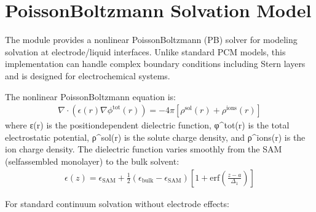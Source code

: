 \documentclass[letterpaper,10pt,english]{sphinxmanual}
\begin{document}
\section{Poisson\sphinxhyphen{}Boltzmann Solvation Model}
\label{\detokenize{examples:poisson-boltzmann-solvation-model}}
\sphinxAtStartPar
The  module provides a non\sphinxhyphen{}linear Poisson\sphinxhyphen{}Boltzmann (PB) solver for modeling solvation at electrode/liquid interfaces. Unlike standard PCM models, this implementation can handle complex boundary conditions including Stern layers and is designed for electrochemical systems.

\sphinxAtStartPar
The non\sphinxhyphen{}linear Poisson\sphinxhyphen{}Boltzmann equation is:
\begin{equation*}
\begin{split}\nabla \cdot (\epsilon(r)\nabla\phi^{\text{tot}}(r)) = -4\pi[\rho^{\text{sol}}(r) + \rho^{\text{ions}}(r)]\end{split}
\end{equation*}
\sphinxAtStartPar
where ε(r) is the position\sphinxhyphen{}dependent dielectric function, φ\textasciicircum{}tot(r) is the total electrostatic potential, ρ\textasciicircum{}sol(r) is the solute charge density, and ρ\textasciicircum{}ions(r) is the ion charge density. The dielectric function varies smoothly from the SAM (self\sphinxhyphen{}assembled monolayer) to the bulk solvent:
\begin{equation*}
\begin{split}\epsilon(z) = \epsilon_{\text{SAM}} + \frac{1}{2}(\epsilon_{\text{bulk}} - \epsilon_{\text{SAM}})\left[1 + \text{erf}\left(\frac{z-a}{\Delta_1}\right)\right]\end{split}
\end{equation*}
\sphinxAtStartPar
{}

\sphinxAtStartPar
For standard continuum solvation without electrode effects:
\end{document}
